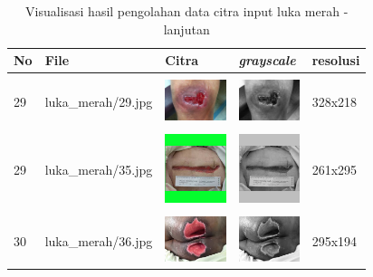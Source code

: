 \begin{table}[H]
	\centering
	\caption{Visualisasi hasil pengolahan data citra input luka merah - lanjutan}
	\label{tabel_input_12}
	\begin{tabular}{|m{0.2in}|m{1.2in}|m{0.7in}|m{0.7in}|m{0.7in}|}
		\hline
		\textbf{No} & \textbf{File} & \textbf{Citra} & \textbf{\emph{grayscale}} & \textbf{resolusi} \\
		\hline
		
		& &  &  &\\
		29 & 
		luka\_merah/29.jpg &
		\includegraphics[width=0.7in]{dataset/dataset_3/luka_merah/ready/29.jpg}&
		\includegraphics[width=0.7in]{dataset/dataset_3/luka_merah/ready/29_gray.jpg}&
		328x218\\
		\hline
		
		& &  &  &\\
		29& 
		luka\_merah/35.jpg &
		\includegraphics[width=0.7in]{dataset/dataset_3/luka_merah/ready/35.jpg}&
		\includegraphics[width=0.7in]{dataset/dataset_3/luka_merah/ready/35_gray.jpg}&
		261x295\\
		\hline
		
		& &  &  &\\
		30& 
		luka\_merah/36.jpg &
		\includegraphics[width=0.7in]{dataset/dataset_3/luka_merah/ready/36.jpg}&
		\includegraphics[width=0.7in]{dataset/dataset_3/luka_merah/ready/36_gray.jpg}&
		295x194\\
		\hline
		

\end{tabular}
\end{table}
